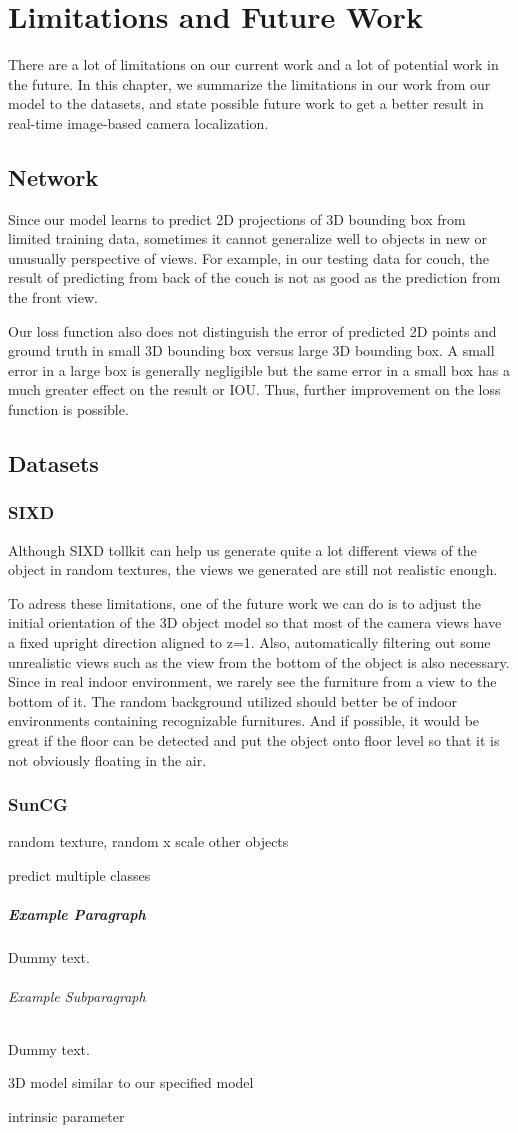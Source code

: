 \chapter{Limitations and Future Work}

There are a lot of limitations on our current work and a lot of potential work in the future. In this chapter, we summarize the limitations in our work from our model to the datasets, and state possible future work to get a better result in real-time image-based camera localization.

\section{Network}

Since our model learns to predict 2D projections of 3D bounding box from limited training data, sometimes it cannot generalize well to objects in new or unusually perspective of views. For example, in our testing data for couch, the result of predicting from back of the couch is not as good as the prediction from the front view.

Our loss function also does not distinguish the error of predicted 2D points and ground truth in small 3D bounding box versus large 3D bounding box. A small error in a large box is generally negligible but the same error in a small box has a much greater effect on the result or IOU. Thus, further improvement on the loss function is possible.

\section{Datasets}
\subsection{SIXD}
\label{sec:SIXD}
Although SIXD tollkit can help us generate quite a lot different views of the object in random textures, the views we generated are still not realistic enough.

To adress these limitations, one of the future work we can do is to adjust the initial orientation of the 3D object model so that most of the camera views have a fixed upright direction aligned to z=1. Also, automatically filtering out some unrealistic views such as the view from the bottom of the object is also necessary. Since in real indoor environment, we rarely see the furniture from a view to the bottom of it. The random background utilized should better be of indoor environments containing recognizable furnitures. And if possible, it would be great if the floor can be detected and put the object onto floor level so that it is not obviously floating in the air.

\subsection{SunCG}
random texture, random x scale
other objects

predict multiple classes


\paragraph{Example Paragraph}

Dummy text.

\subparagraph{Example Subparagraph}

Dummy text.


3D model similar to our specified model

 intrinsic parameter
